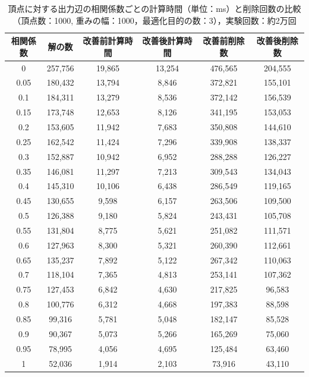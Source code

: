 \documentclass[12pt]{optlab-bachelor}
\begin{document}
\begin{table}[h]
  \centering
  \caption{頂点に対する出力辺の相関係数ごとの計算時間（単位：ms）と削除回数の比較（頂点数：1000,
  重みの幅：1000，最適化目的の数：3），実験回数：約2万回}
  {\small
  \begin{tabular}{|c|c|c|c|c|c|} \hline
    相関係数 & 解の数 & 改善前計算時間 & 改善後計算時間 & 改善前削除数 & 改善後削除数 \\ \hline
    0 & 257,756 & 19,865 & 13,254 & 476,565 & 204,555 \\ \hline
    0.05 & 180,432 & 13,794 & 8,846 & 372,821 & 155,101 \\ \hline
    0.1 & 184,311 & 13,279 & 8,536 & 372,142 & 156,539 \\ \hline
    0.15 & 173,748 & 12,653 & 8,126 & 341,195 & 153,053 \\ \hline
    0.2 & 153,605 & 11,942 & 7,683 & 350,808 & 144,610 \\ \hline
    0.25 & 162,542 & 11,424 & 7,296 & 339,908 & 138,337 \\ \hline
    0.3 & 152,887 & 10,942 & 6,952 & 288,288 & 126,227 \\ \hline
    0.35 & 146,081 & 11,297 & 7,213 & 309,543 & 134,043 \\ \hline
    0.4 & 145,310 & 10,106 & 6,438 & 286,549 & 119,165 \\ \hline
    0.45 & 130,655 & 9,598 & 6,157 & 263,506 & 109,500 \\ \hline
    0.5 & 126,388 & 9,180 & 5,824 & 243,431 & 105,708 \\ \hline
    0.55 & 131,804 & 8,775 & 5,621 & 251,082 & 111,571 \\ \hline
    0.6 & 127,963 & 8,300 & 5,321 & 260,390 & 112,661 \\ \hline
    0.65 & 135,237 & 7,892 & 5,122 & 267,342 & 110,063 \\ \hline
    0.7 & 118,104 & 7,365 & 4,813 & 253,141 & 107,362 \\ \hline
    0.75 & 127,453 & 6,842 & 4,630 & 217,825 & 96,583 \\ \hline
    0.8 & 100,776 & 6,312 & 4,668 & 197,383 & 88,598 \\ \hline
    0.85 & 99,316 & 5,781 & 5,048 & 182,147 & 85,528 \\ \hline
    0.9 & 90,367 & 5,073 & 5,266 & 165,269 & 75,060 \\ \hline
    0.95 & 78,995 & 4,056 & 4,695 & 125,484 & 63,460 \\ \hline
    1 & 52,036 & 1,914 & 2,103 & 73,916 & 43,110 \\ \hline
  \end{tabular}
  }
\end{table}
\end{document}
